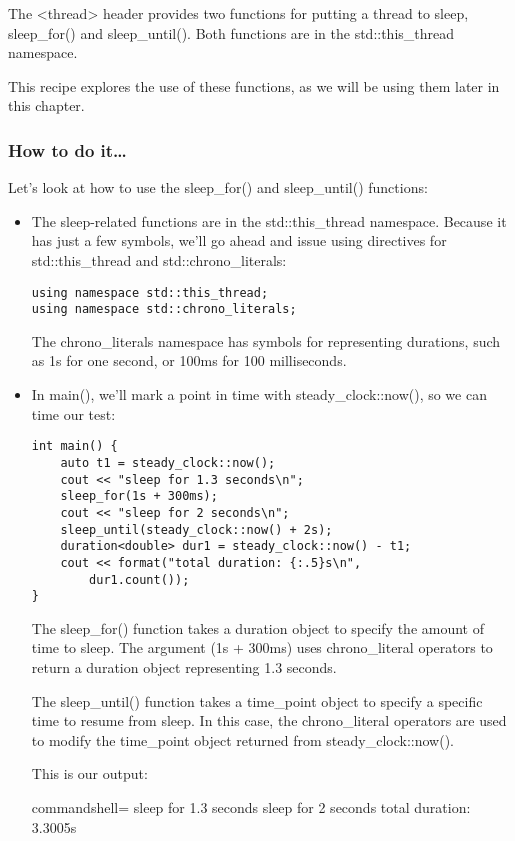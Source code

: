 
The <thread> header provides two functions for putting a thread to sleep, sleep\_for() and sleep\_until(). Both functions are in the std::this\_thread namespace.

This recipe explores the use of these functions, as we will be using them later in this chapter.

\subsubsection{How to do it…}

Let's look at how to use the sleep\_for() and sleep\_until() functions:

\begin{itemize}
\item 
The sleep-related functions are in the std::this\_thread namespace. Because it has just a few symbols, we'll go ahead and issue using directives for std::this\_thread and std::chrono\_literals:

\begin{lstlisting}[style=styleCXX]
using namespace std::this_thread;
using namespace std::chrono_literals;
\end{lstlisting}

The chrono\_literals namespace has symbols for representing durations, such as 1s for one second, or 100ms for 100 milliseconds.

\item 
In main(), we'll mark a point in time with steady\_clock::now(), so we can time our test:

\begin{lstlisting}[style=styleCXX]
int main() {
	auto t1 = steady_clock::now();
	cout << "sleep for 1.3 seconds\n";
	sleep_for(1s + 300ms);
	cout << "sleep for 2 seconds\n";
	sleep_until(steady_clock::now() + 2s);
	duration<double> dur1 = steady_clock::now() - t1;
	cout << format("total duration: {:.5}s\n",
		dur1.count());
}
\end{lstlisting}

The sleep\_for() function takes a duration object to specify the amount of time to sleep. The argument (1s + 300ms) uses chrono\_literal operators to return a duration object representing 1.3 seconds.

The sleep\_until() function takes a time\_point object to specify a specific time to resume from sleep. In this case, the chrono\_literal operators are used to modify the time\_point object returned from steady\_clock::now().

This is our output:

\begin{tcblisting}{commandshell={}}
sleep for 1.3 seconds
sleep for 2 seconds
total duration: 3.3005s
\end{tcblisting}

\end{itemize}

